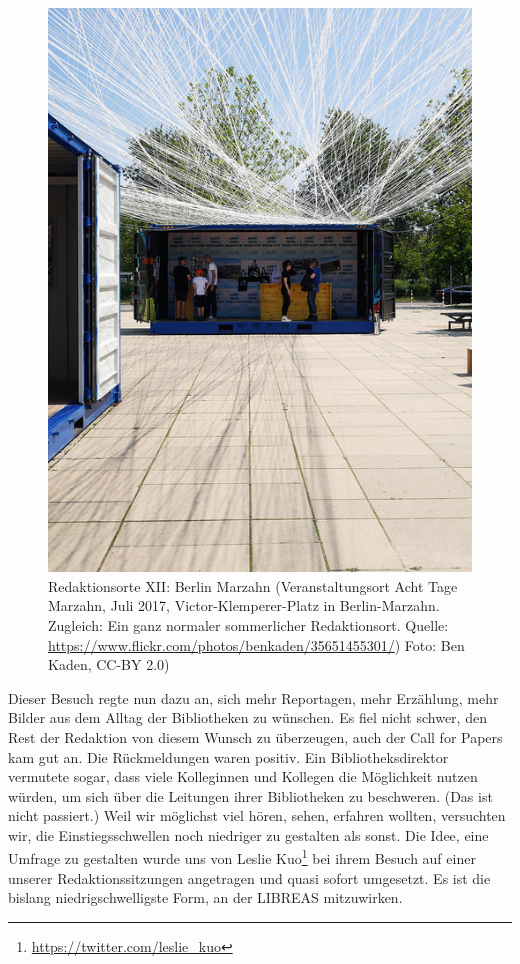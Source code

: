 \documentclass[a4paper,
fontsize=11pt,
oneside,
numbers=noperiodatend,
parskip=half-,
bibliography=totoc,
final
]{scrartcl}
\begin{document}
\begin{figure}
\centering
\includegraphics{image_1.jpg}
\caption{Redaktionsorte XII: Berlin Marzahn (Veranstaltungsort Acht Tage
Marzahn, Juli 2017, Victor-Klemperer-Platz in Berlin-Marzahn. Zugleich:
Ein ganz normaler sommerlicher Redaktionsort. Quelle:
\url{https://www.flickr.com/photos/benkaden/35651455301/}) Foto: Ben
Kaden, CC-BY 2.0)}
\end{figure}

Dieser Besuch regte nun dazu an, sich mehr Reportagen, mehr Erzählung,
mehr Bilder aus dem Alltag der Bibliotheken zu wünschen. Es fiel nicht
schwer, den Rest der Redaktion von diesem Wunsch zu überzeugen, auch der
Call for Papers kam gut an. Die Rückmeldungen waren positiv. Ein
Bibliotheksdirektor vermutete sogar, dass viele Kolleginnen und Kollegen
die Möglichkeit nutzen würden, um sich über die Leitungen ihrer
Bibliotheken zu beschweren. (Das ist nicht passiert.) Weil wir möglichst
viel hören, sehen, erfahren wollten, versuchten wir, die
Einstiegsschwellen noch niedriger zu gestalten als sonst. Die Idee, eine
Umfrage zu gestalten wurde uns von Leslie Kuo\footnote{\url{https://twitter.com/leslie_kuo}}
bei ihrem Besuch auf einer unserer Redaktionssitzungen angetragen und
quasi sofort umgesetzt. Es ist die bislang niedrigschwelligste Form, an
der LIBREAS mitzuwirken.
\end{document}
